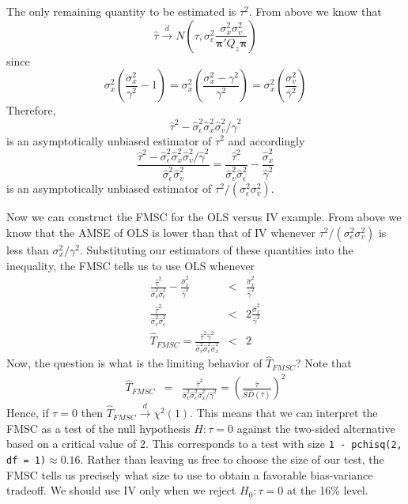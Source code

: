 \documentclass[12pt]{article}
\theoremstyle{definition}
\begin{document}
 The only remaining quantity to be estimated is $\tau^2$. From above we know that 
    $$\widehat{\tau} \overset{d}{\rightarrow} N\left(\tau,\sigma_\epsilon^2 \frac{\sigma_x^2\sigma_v^2}{\boldsymbol{\pi}'Q_z \boldsymbol{\pi}}\right)$$
since
  $$\sigma_x^2 \left(\frac{\sigma_x^2}{\gamma^2} - 1 \right) = \sigma_x^2 \left(\frac{\sigma_x^2 - \gamma^2}{\gamma^2} \right) = \sigma_x^2 \left(\frac{\sigma_v^2}{\gamma^2}\right)$$
Therefore,
  $$\widehat{\tau}^2 - \widehat{\sigma}_\epsilon^2\widehat{\sigma}_x^2 \widehat{\sigma}_v^2/\widehat{\gamma}^2$$
is an asymptotically unbiased estimator of $\tau^2$ and accordingly
  $$\frac{\widehat{\tau}^2 - \widehat{\sigma}_\epsilon^2\widehat{\sigma}_x^2 \widehat{\sigma}_v^2/\widehat{\gamma}^2}{\widehat{\sigma}_\epsilon^2 \widehat{\sigma}_v^2} = \frac{\widehat{\tau}^2}{\widehat{\sigma}_v^2 \widehat{\sigma}_\epsilon^2} - \frac{\widehat{\sigma}_x^2}{\widehat{\gamma}^2}$$
is an asymptotically unbiased estimator of $\tau^2/(\sigma_\epsilon^2 \sigma_v^2)$.

Now we can construct the FMSC for the OLS versus IV example. From above we know that the AMSE of OLS is lower than that of IV whenever $\tau^2/(\sigma_\epsilon^2 \sigma_v^2)$ is less than $\sigma_x^2/\gamma^2$. Substituting our estimators of these quantities into the inequality, the FMSC tells us to use OLS whenever
  \begin{eqnarray*}
       \frac{\widehat{\tau}^2}{\widehat{\sigma}_v^2 \widehat{\sigma}_\epsilon^2} - \frac{\widehat{\sigma}_x^2}{\widehat{\gamma}^2} &<& \frac{\widehat{\sigma}_x^2}{\widehat{\gamma}^2}\\
       \frac{\widehat{\tau}^2}{\widehat{\sigma}_v^2 \widehat{\sigma}_\epsilon^2} &<& 2 \frac{\widehat{\sigma}_x^2}{\widehat{\gamma}^2} \\
        \widehat{T}_{FMSC} = \frac{\widehat{\tau}^2 \widehat{\gamma}^2}{\widehat{\sigma}_v^2 \widehat{\sigma}_\epsilon^2 \widehat{\sigma}_x^2} &<& 2
  \end{eqnarray*}
Now, the question is what is the limiting behavior of $\widehat{T}_{FMSC}$? Note that
  \begin{eqnarray*}
    \widehat{T}_{FMSC} &=& \frac{\widehat{\tau}^2 }{\widehat{\sigma}_v^2 \widehat{\sigma}_\epsilon^2 \widehat{\sigma}_x^2/\widehat{\gamma}^2} = \left(\frac{\widehat{\tau}}{\widehat{SD}(\widehat{\tau})}\right)^2
  \end{eqnarray*}
Hence, if $\tau = 0$ then $\widehat{T}_{FMSC} \overset{d}{\rightarrow} \chi^2(1)$. This means that we can interpret the FMSC as a test of the null hypothesis $H\colon \tau = 0$ against the two-sided alternative based on a critical value of $2$. This corresponds to a test with size  \texttt{1 - pchisq(2, df = 1)}$\approx 0.16$. Rather than leaving us free to choose the size of our test, the FMSC tells us precisely what size to use to obtain a favorable bias-variance tradeoff. We should use IV only when we reject $H_0\colon \tau = 0$ at the 16\% level. 
\end{document}

